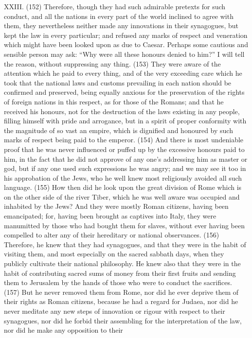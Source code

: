 XXIII. (152) Therefore, though they had such admirable pretexts for such conduct, and all the
nations in every part of the world inclined to agree with them, they nevertheless neither made any
innovations in their synagogues, but kept the law in every particular; and refused any marks of
respect and veneration which might have been looked upon as due to Caesar. Perhaps some
cautious and sensible person may ask: ``Why were all these honours denied to him?'' I will tell the
reason, without suppressing any thing. (153) They were aware of the attention which he paid to
every thing, and of the very exceeding care which he took that the national laws and customs
prevailing in each nation should be confirmed and preserved, being equally anxious for the
preservation of the rights of foreign nations in this respect, as for those of the Romans; and that
he received his honours, not for the destruction of the laws existing in any people, filling himself
with pride and arrogance, but in a spirit of proper conformity with the magnitude of so vast an
empire, which is dignified and honoured by such marks of respect being paid to the emperor. (154)
And there is most undeniable proof that he was never influenced or puffed up by the excessive
honours paid to him, in the fact that he did not approve of any one's addressing him as master or
god, but if any one used such expressions he was angry; and we may see it too in his approbation
of the Jews, who he well knew most religiously avoided all such language. (155) How then did he
look upon the great division of Rome which is on the other side of the river Tiber, which he was well
aware was occupied and inhabited by the Jews? And they were mostly Roman citizens, having
been emancipated; for, having been brought as captives into Italy, they were manumitted by those
who had bought them for slaves, without ever having been compelled to alter any of their hereditary
or national observances. (156) Therefore, he knew that they had synagogues, and that they were
in the habit of visiting them, and most especially on the sacred sabbath days, when they publicly
cultivate their national philosophy. He knew also that they were in the habit of contributing sacred
sums of money from their first fruits and sending them to Jerusalem by the hands of those who
were to conduct the sacrifices. (157) But he never removed them from Rome, nor did he ever
deprive them of their rights as Roman citizens, because he had a regard for Judaea, nor did he
never meditate any new steps of innovation or rigour with respect to their synagogues, nor did he
forbid their assembling for the interpretation of the law, nor did he make any opposition to their
